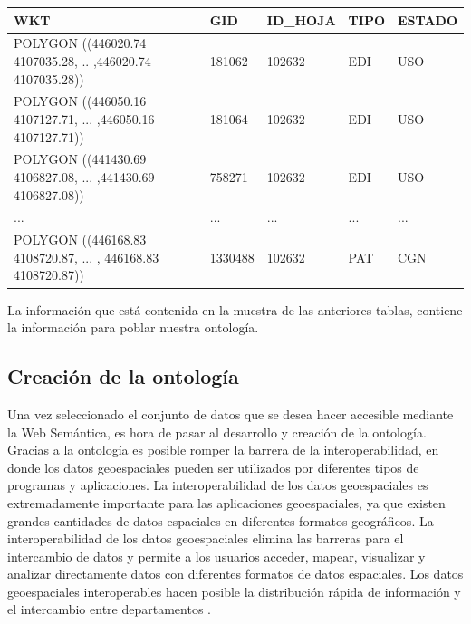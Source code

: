 \begin{table}[H]
	\begin{tabular}{|l|l|l|l|l|}
		\hline
		\rowcolor[HTML]{EFEFEF} 
		\textbf{WKT}                        & \textbf{GID} & \textbf{ID\_HOJA} & \textbf{TIPO} & \textbf{ESTADO} \\ \hline
		POLYGON ((446020.74 4107035.28, .. ,446020.74 4107035.28)) & 181062       & 102632            & EDI           & USO                       \\ \hline
		POLYGON ((446050.16 4107127.71, ... ,446050.16 4107127.71))  & 181064       & 102632            & EDI           & USO                  \\ \hline
		POLYGON ((441430.69 4106827.08, ... ,441430.69 4106827.08)) & 758271       & 102632            & EDI           & USO                     \\ \hline
		...  & ...       & ...            & ...           & ...                     \\ \hline
		POLYGON ((446168.83 4108720.87, ... , 446168.83 4108720.87)) & 1330488       & 102632            & PAT           & CGN                    \\ \hline
	\end{tabular}
\end{table}

La información que está contenida en la muestra de las anteriores tablas, contiene la información para poblar nuestra ontología.




\subsection{Creación de la ontología}

Una vez seleccionado el conjunto de datos que se desea hacer accesible mediante la Web Semántica, es hora de pasar al desarrollo y creación de la ontología. Gracias a la ontología es posible romper la barrera de la interoperabilidad, en donde los datos geoespaciales pueden ser utilizados por diferentes tipos de programas y aplicaciones. La interoperabilidad de los datos geoespaciales es extremadamente importante para las aplicaciones geoespaciales, ya que existen grandes cantidades de datos espaciales en diferentes formatos geográficos. La interoperabilidad de los datos geoespaciales elimina las barreras para el intercambio de datos y permite a los usuarios acceder, mapear, visualizar y analizar directamente datos con diferentes formatos de datos espaciales. Los datos geoespaciales interoperables hacen posible la distribución rápida de información y el intercambio entre departamentos \cite{libro-gis}.\\

